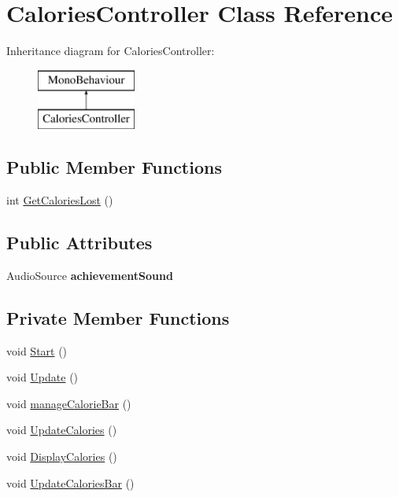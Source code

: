 \hypertarget{class_calories_controller}{}\section{Calories\+Controller Class Reference}
\label{class_calories_controller}
Inheritance diagram for Calories\+Controller\+:\begin{figure}[H]
\begin{center}
\leavevmode
\includegraphics[height=2.000000cm]{class_calories_controller}
\end{center}
\end{figure}
\subsection*{Public Member Functions}
\begin{DoxyCompactItemize}
\item 
int \mbox{\hyperlink{class_calories_controller_a78ac27ea6bf24258bbdbfbc65e91cc9d}{Get\+Calories\+Lost}} ()
\end{DoxyCompactItemize}
\subsection*{Public Attributes}
\begin{DoxyCompactItemize}
\item 
\mbox{\label{class_calories_controller_a39f485b1d759d0ded338a265d095cb2b}} 
Audio\+Source {\bfseries achievement\+Sound}
\end{DoxyCompactItemize}
\subsection*{Private Member Functions}
\begin{DoxyCompactItemize}
\item 
void \mbox{\hyperlink{class_calories_controller_ac97768ccdf48f93721631c1b5dca134b}{Start}} ()
\item 
void \mbox{\hyperlink{class_calories_controller_ac4aa187458c0c1b20d4be1e84827607d}{Update}} ()
\item 
void \mbox{\hyperlink{class_calories_controller_a5973455b55655d023de4632a577b1868}{manage\+Calorie\+Bar}} ()
\item 
void \mbox{\hyperlink{class_calories_controller_a7c3eb22600ee2e6b44e17b765c22b9e8}{Update\+Calories}} ()
\item 
void \mbox{\hyperlink{class_calories_controller_a1e98a94df30539c1ab3c2b7b6acc3003}{Display\+Calories}} ()
\item 
void \mbox{\hyperlink{class_calories_controller_a4b9e444baac73fd0fe7d17e3b0b06c89}{Update\+Calories\+Bar}} ()
\end{DoxyCompactItemize}
